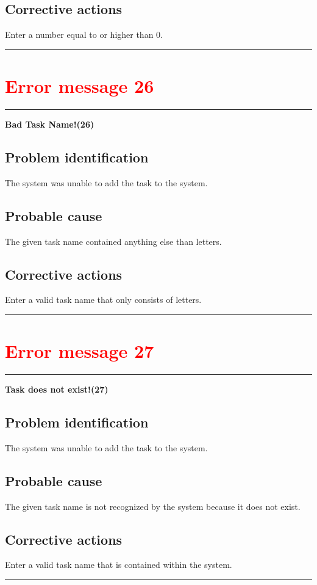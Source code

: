 \subsection{Corrective actions}
Enter a number equal to or higher than 0.
\vspace{0.5cm}
\hrule
\hfill



\section{\textbf{\textcolor{red}{Error message 26}}}
\hrule
\vspace{0.5cm}
\textbf{Bad Task Name!(26)}
\subsection{Problem identification}
The system was unable to add the task to the system.

\subsection{Probable cause}
The given task name contained anything else than letters.

\subsection{Corrective actions}
Enter a valid task name that only consists of letters.
\vspace{0.5cm}
\hrule
\hfill


\section{\textbf{\textcolor{red}{Error message 27}}}
\hrule
\vspace{0.5cm}
\textbf{Task does not exist!(27)}
\subsection{Problem identification}
The system was unable to add the task to the system.

\subsection{Probable cause}
The given task name is not recognized by the system because it does not exist.

\subsection{Corrective actions}
Enter a valid task name that is contained within the system.
\vspace{0.5cm}
\hrule
\hfill




